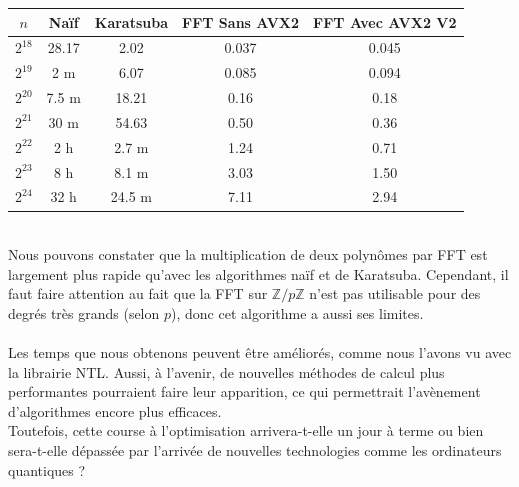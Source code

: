 \documentclass[12pt, a4paper]{article}
\begin{document}
\begin{center}
\begin{tabular}{||c c c c c||}
\hline
$n$ & Naïf & Karatsuba & FFT Sans AVX2 & FFT Avec AVX2 V2 \\
\hline\hline
$2^{18}$ & 28.17 & 2.02 & 0.037 & 0.045 \\
\hline
$2^{19}$ & 2 m & 6.07 & 0.085 & 0.094 \\
\hline
$2^{20}$ & 7.5 m & 18.21 & 0.16 & 0.18 \\
\hline
$2^{21}$ & 30 m & 54.63 & 0.50 & 0.36 \\
\hline
$2^{22}$ & 2 h & 2.7 m & 1.24 & 0.71 \\
\hline
$2^{23}$ & 8 h & 8.1 m & 3.03 & 1.50 \\
\hline
$2^{24}$ & 32 h & 24.5 m & 7.11 & 2.94 \\
\hline
\end{tabular}
\end{center}
{}
\ \\
\indent Nous pouvons constater que la multiplication de deux polynômes par FFT est largement plus rapide qu'avec les algorithmes naïf et de Karatsuba. Cependant, il faut faire attention au fait que la FFT sur $\mathbb{Z}/p\mathbb{Z}$ n'est pas utilisable pour des degrés très grands (selon $p$), donc cet algorithme a aussi ses limites.\\ \\
\indent Les temps que nous obtenons peuvent être améliorés, comme nous l'avons vu avec la librairie NTL. Aussi, à l'avenir, de nouvelles méthodes de calcul plus performantes pourraient faire leur apparition, ce qui permettrait l'avènement d'algorithmes encore plus efficaces. \\
Toutefois, cette course à l'optimisation arrivera-t-elle un jour à terme ou bien sera-t-elle dépassée par l'arrivée de nouvelles technologies comme les ordinateurs quantiques ?

\newpage



\end{document}

